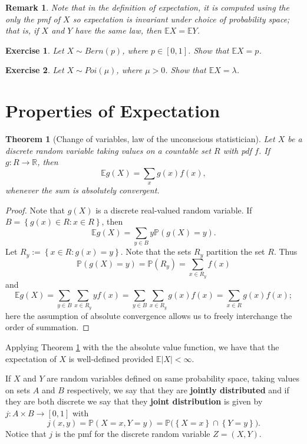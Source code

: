 \documentclass[12pt, reqno]{amsart}
\newtheorem{theorem}{Theorem}
\newtheorem{remark}{Remark}
\newtheorem{ex}{Exercise}[section]
\newcommand\dff[1]{\textbf{#1}}
\newcommand\ns[1]{ \left\{ {#1} \right\} }
\renewcommand{\P}{{\mathbb P}}  %
\newcommand{\R}{{\mathbb R}}
\newcommand{\E}{{\mathbb E}}     %
\begin{document}
\begin{remark} 
\label{dist}
Note that in the definition of expectation, it is computed using the only the pmf of $X$ so expectation is invariant under choice of probability space; that is, if $X$ and $Y$ have the same law, then $\E X = \E Y$.  
\end{remark}


\begin{ex}
\label{bern}
    Let $X \sim Bern(p)$, where $p \in [0,1]$.   Show that $\E X=p$. 

\end{ex}



\begin{ex}  Let $X \sim Poi(\mu)$, where $\mu >0$.   Show that $\E X = \lambda$. 

\end{ex}

\section{Properties of Expectation}

\begin{theorem}[Change of variables, law of the unconscious statistician]
\label{CV}
Let $X$ be a discrete random variable  taking values on a countable set $R$ with pdf $f$.   If $g: R\to \R$, then 
	$$ \E g(X) = \sum_x g(x)f(x),$$
	whenever the sum is absolutely convergent.  
\end{theorem}

\begin{proof}
Note that $g(X)$ is a discrete real-valued random variable.  If $B = \ns{ g(x) \in R: x\in R}$, then   
	$$\E g(X) = \sum_{y \in B}  y\P(g(X) =y).$$
  Let $R_y := \ns{x \in R: g(x)=y }$.  Note that the sets $R_y$ partition the set $R$.    Thus 
$$\P(g(X)=y  ) = \P(R_y) = \sum_{x \in R_y} f(x)$$
and
$$\E g(X) = \sum_{y \in B}\sum_{x \in R_y} yf(x) = \sum_{y \in B} \sum_{x \in R_y} g(x)f(x) = \sum_{x \in R}g(x)f(x);$$
here the assumption of absolute convergence allows us to freely interchange the order of summation.
\end{proof}
Applying Theorem \ref{CV} with the the absolute value function, we have that the expectation of $X$  is well-defined provided $\E |X| < \infty$. 


If $X$ and $Y$ are random variables defined on same probability space, taking values on sets $A$ and $B$ respectively, we say that they are \dff{jointly distributed} and if they are both discrete we say that they \dff{joint distribution} is given by $j : A \times B \to [0,1]$ with 
$$ j(x,y) = \P(X=x, Y=y) = \P \big( \ns{ X=x} \cap \ns{Y =y} \big).$$
Notice that $j$ is the pmf for the discrete random variable $Z = (X,Y)$.
\end{document}
